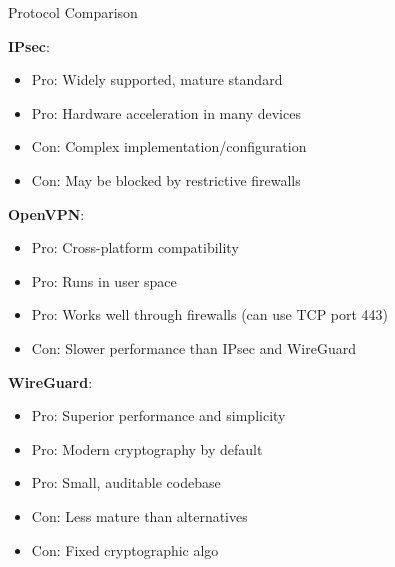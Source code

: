 \begin{concept}{Protocol Comparison}
    \footnotesize

    \begin{minipage}{0.35\linewidth}
\textbf{IPsec}:
    \begin{itemize}
        \item Pro: Widely supported, mature standard
        \item Pro: Hardware acceleration in many devices
        \item Con: Complex implementation/configuration
        \item Con: May be blocked by restrictive firewalls
    \end{itemize}
    \end{minipage}
    \begin{minipage}{0.3\linewidth}
        \vspace{-4mm}
\textbf{OpenVPN}:
    \begin{itemize}
        \item Pro: Cross-platform compatibility
        \item Pro: Runs in user space
        \item Pro: Works well through firewalls (can use TCP port 443)
        \item Con: Slower performance than IPsec and WireGuard
    \end{itemize}
    \end{minipage}
    \begin{minipage}{0.35\linewidth}
        \vspace{-6mm}
\textbf{WireGuard}:
    \begin{itemize}
        \item Pro: Superior performance and simplicity
        \item Pro: Modern cryptography by default
        \item Pro: Small, auditable codebase
        \item Con: Less mature than alternatives
        \item Con: Fixed cryptographic algo
    \end{itemize}
    \end{minipage}

\end{concept}


